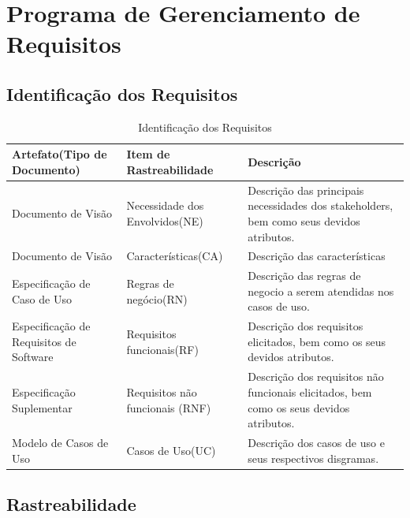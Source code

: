\section{Programa de Gerenciamento de Requisitos}

\subsection{Identificação dos Requisitos}

\begin{table}[h!]
\centering
\caption{Identificação dos Requisitos}
\label{identification}
\begin{tabular}{|p{4cm}|p{4cm}|p{4cm}|}
\hline
Artefato(Tipo de Documento)             & Item de Rastreabilidade         & Descrição                                                                                \\ \hline
Documento de Visão                      & Necessidade dos Envolvidos(NE)  & Descrição das principais necessidades dos stakeholders, bem como seus devidos atributos. \\ \hline
Documento de Visão                      & Características(CA)             & Descrição das características                                                            \\ \hline
Especificação de Caso de Uso            & Regras de negócio(RN)           & Descrição das regras de negocio a serem atendidas nos casos de uso.                      \\ \hline
Especificação de Requisitos de Software & Requisitos funcionais(RF)       & Descrição dos requisitos elicitados, bem como os seus devidos atributos.                 \\ \hline
Especificação Suplementar               & Requisitos não funcionais (RNF) & Descrição dos requisitos não funcionais elicitados, bem como os seus devidos atributos.  \\ \hline
Modelo de Casos de Uso                  & Casos de Uso(UC)                & Descrição dos casos de uso e seus respectivos disgramas.                                 \\ \hline
\end{tabular}
\end{table}

\clearpage{}

\subsection{Rastreabilidade}

